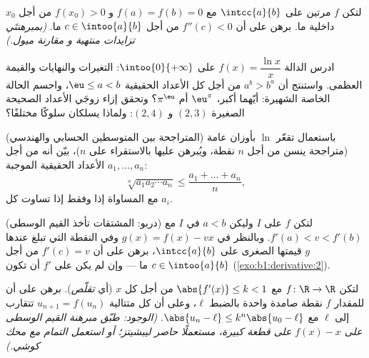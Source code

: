 \begin{exercise}[$\star\star$]\label{exo:b1:derivative:7}
لتكن $f$  مرتين على $\intcc{a}{b}$ مع $f(a) = f(b)
= 0$ و $f(x_0) > 0$ من أجل $x_0$ داخلية ما. برهن على أن $f''(c) <
0$ من أجل $c \in \intoo{a}{b}$ ما. \emph{(بمبرهنتَي تزايدات منتهية و
مقارنة ميول.)}
\end{exercise}

\begin{exercise}[$\star\star$]\label{exo:b1:derivative:8}
ادرس الدالة $f(x) = \dfrac{\ln x}{x}$ على
$\intoo{0}{+\infty}$: التغيرات والنهايات والقيمة العظمى. واستنتج أن $a^b
> b^a$ من أجل كل الأعداد الحقيقية $\eu \leq a < b$، واحسم الحالة الخاصة
الشهيرة: أيّهما أكبر، $\eu^\pi$ أم $\pi^\eu$؟ وتحقق إزاء
زوجَي الأعداد الصحيحة الصغيرة $(2,3)$ و $(2,4)$: ولماذا يسلكان
سلوكًا مختلفًا؟
\end{exercise}

\begin{exercise}[$\star\star$]\label{exo:b1:derivative:9}
(المتراجحة بين المتوسطين الحسابي والهندسي) باستعمال تقعّر $\ln$ بأوزان
عامة (متراجحة ينسن من أجل $n$ نقطة، ويُبرهن عليها
بالاستقراء على $n$)، بيّن أنه من أجل الأعداد الحقيقية الموجبة $a_1, \dots, a_n$:
\[
\sqrt[n]{a_1 a_2 \cdots a_n} \leq \frac{a_1 + \dots + a_n}{n},
\]
مع المساواة إذا وفقط إذا تساوت كل $a_i$.
\end{exercise}

\begin{exercise}[$\star\star\star$]\label{exo:b1:derivative:10}
(دربو: المشتقات تأخذ القيم الوسطى) لتكن $f$
 على $I$ وليكن $a < b$ في $I$ مع $f'(a) < v < f'(b)$.
وبالنظر في $g(x) = f(x) - vx$ وفي النقطة التي تبلغ عندها $g$
قيمتها الصغرى على $\intcc{a}{b}$، برهن على أن $f'(c) = v$ من أجل $c
\in \intoo{a}{b}$ ما --- وإن لم يكن على $f'$ أن تكون 
(\cref{exo:b1:derivative:2}).
\end{exercise}

\begin{exercise}[$\star\star\star$]\label{exo:b1:derivative:11}
لتكن $f \colon \R \to \R$  مع $\abs{f'(x)} \leq k
< 1$ من أجل كل $x$ (أي \emph{تقلّص}). برهن على أن للمقدار $f$
نقطة صامدة واحدة بالضبط $\ell$، وعلى أن كل متتالية $u_{n+1} = f(u_n)$
تتقارب إلى $\ell$ مع $\abs{u_n - \ell} \leq k^n\abs{u_0 -
\ell}$. \emph{(الوجود: طبّق مبرهنة القيم الوسطى على
$f(x) - x$ على قطعة كبيرة، مستعملًا حاصر ليبشيتز؛ أو استعمل
التمام مع محك كوشي.)}
\end{exercise}

